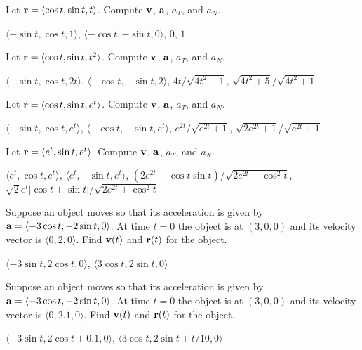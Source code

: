 \begin{enumialphparenastyle}


\begin{ex}
Let ${\bf r}=\langle \cos t,\sin t,t\rangle$. 
Compute ${\bf v}$, ${\bf a}$,
$a_T$, and $a_N$.
\begin{sol}
	$\langle -\sin t,\cos t,1\rangle$,
	$\langle -\cos t, -\sin t,0\rangle$,
	$0$, $1$
\end{sol}
\end{ex}

\begin{ex}
Let ${\bf r}=\langle \cos t,\sin t,t^2\rangle$. 
Compute ${\bf v}$, ${\bf a}$,
$a_T$, and $a_N$.
\begin{sol}
	$\langle -\sin t,\cos t,2t\rangle$,
	$\langle -\cos t, -\sin t,2\rangle$,
	$4t/\sqrt{4t^2+1}$, $\sqrt{4t^2+5}/\sqrt{4t^2+1}$
\end{sol}
\end{ex}

\begin{ex}
Let ${\bf r}=\langle \cos t,\sin t,e^t\rangle$. 
Compute ${\bf v}$, ${\bf a}$,
$a_T$, and $a_N$.
\begin{sol}
	$\langle -\sin t,\cos t,e^t\rangle$,
	$\langle -\cos t, -\sin t,e^t\rangle$,
	$e^{2t}/\sqrt{e^{2t}+1}$, $\sqrt{2e^{2t}+1}/\sqrt{e^{2t}+1}$
\end{sol}
\end{ex}

\begin{ex}
Let ${\bf r}=\langle e^t,\sin t,e^t\rangle$. 
Compute ${\bf v}$, ${\bf a}$,
$a_T$, and $a_N$.
\begin{sol}
	$\langle e^t,\cos t,e^t\rangle$,
	$\langle e^t, -\sin t,e^t\rangle$,
	$(2e^{2t}-\cos t\sin t)/\sqrt{2e^{2t}+\cos^2 t}$, 
	$\sqrt{2}e^t|\cos t+\sin t|/\sqrt{2e^{2t}+\cos^2 t}$
\end{sol}
\end{ex}

\begin{ex}
Suppose an object moves so that its acceleration is given by
${\bf a}=\langle -3\cos t,-2\sin t,0\rangle$. At time $t=0$ the object
is at $(3,0,0)$ and its velocity vector is $\langle
0,2,0\rangle$. Find ${\bf v}(t)$ and ${\bf r}(t)$ for the object.
\begin{sol}
	$\langle -3\sin t,2\cos t,0\rangle$,
	$\langle 3\cos t, 2\sin t,0\rangle$
\end{sol}
\end{ex}

\begin{ex}
Suppose an object moves so that its acceleration is given by
${\bf a}=\langle -3\cos t,-2\sin t,0\rangle$. At time $t=0$ the object
is at $(3,0,0)$ and its velocity vector is $\langle
0,2.1,0\rangle$. Find ${\bf v}(t)$ and ${\bf r}(t)$ for the object.
\begin{sol}
	$\langle -3\sin t,2\cos t+0.1,0\rangle$,
	$\langle 3\cos t, 2\sin t+t/10,0\rangle$
\end{sol}
\end{ex}


\end{enumialphparenastyle}
